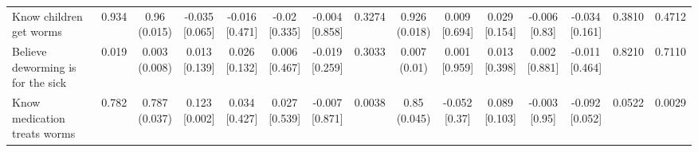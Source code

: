 {\begin{tabular}[t]{lcccccccccccccc}
\hspace{1em}Know children get worms & 0.934 & \makecell[c]{0.96\\(0.015)} & \makecell[c]{-0.035\\{[0.065]}} & \makecell[c]{-0.016\\{[0.471]}} & \makecell[c]{-0.02\\{[0.335]}} & \makecell[c]{-0.004\\{[0.858]}} & 0.3274 & \makecell[c]{0.926\\(0.018)} & \makecell[c]{0.009\\{[0.694]}} & \makecell[c]{0.029\\{[0.154]}} & \makecell[c]{-0.006\\{[0.83]}} & \makecell[c]{-0.034\\{[0.161]}} & 0.3810 & 0.4712\\
\hspace{1em}Believe deworming is for the sick & 0.019 & \makecell[c]{0.003\\(0.008)} & \makecell[c]{0.013\\{[0.139]}} & \makecell[c]{0.026\\{[0.132]}} & \makecell[c]{0.006\\{[0.467]}} & \makecell[c]{-0.019\\{[0.259]}} & 0.3033 & \makecell[c]{0.007\\(0.01)} & \makecell[c]{0.001\\{[0.959]}} & \makecell[c]{0.013\\{[0.398]}} & \makecell[c]{0.002\\{[0.881]}} & \makecell[c]{-0.011\\{[0.464]}} & 0.8210 & 0.7110\\
\hspace{1em}Know medication treats worms & 0.782 & \makecell[c]{0.787\\(0.037)} & \makecell[c]{0.123\\{[0.002]}} & \makecell[c]{0.034\\{[0.427]}} & \makecell[c]{0.027\\{[0.539]}} & \makecell[c]{-0.007\\{[0.871]}} & 0.0038 & \makecell[c]{0.85\\(0.045)} & \makecell[c]{-0.052\\{[0.37]}} & \makecell[c]{0.089\\{[0.103]}} & \makecell[c]{-0.003\\{[0.95]}} & \makecell[c]{-0.092\\{[0.052]}} & 0.0522 & 0.0029\\

\end{tabular}}
